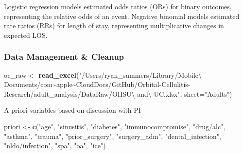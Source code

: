 \documentclass[
]{article}
\newenvironment{Shaded}{\begin{snugshade}}{\end{snugshade}}
\newcommand{\AttributeTok}[1]{\textcolor[rgb]{0.13,0.29,0.53}{#1}}
\newcommand{\FunctionTok}[1]{\textcolor[rgb]{0.13,0.29,0.53}{\textbf{#1}}}
\newcommand{\NormalTok}[1]{#1}
\newcommand{\OtherTok}[1]{\textcolor[rgb]{0.56,0.35,0.01}{#1}}
\newcommand{\StringTok}[1]{\textcolor[rgb]{0.31,0.60,0.02}{#1}}
\begin{document}
Logistic regression models estimated odds ratios (ORs) for binary outcomes,
representing the relative odds of an event. Negative binomial models estimated
rate ratios (RRs) for length of stay, representing multiplicative changes in
expected LOS.

\subsubsection{Data Management \& Cleanup}\label{data-management-cleanup}

\begin{Shaded}
\begin{Highlighting}[]
\NormalTok{oc\_raw }\OtherTok{\textless{}{-}} \FunctionTok{read\_excel}\NormalTok{(}\StringTok{"/Users/ryan\_summers/Library/Mobile\textbackslash{} Documents/com\textasciitilde{}apple\textasciitilde{}CloudDocs/GitHub/Orbital{-}Cellulitis{-}Research/adult\_analysis/DataRaw/OHSU\textbackslash{} and\textbackslash{} UC.xlsx"}\NormalTok{, }\AttributeTok{sheet=}\StringTok{"Adults"}\NormalTok{)}
\end{Highlighting}
\end{Shaded}

A priori variables based on discussion with PI

\begin{Shaded}
\begin{Highlighting}[]
\NormalTok{priori }\OtherTok{\textless{}{-}} \FunctionTok{c}\NormalTok{(}\StringTok{"age"}\NormalTok{, }\StringTok{"sinusitis"}\NormalTok{, }\StringTok{"diabetes"}\NormalTok{, }\StringTok{"immunocompromise"}\NormalTok{, }\StringTok{"drug/alc"}\NormalTok{,}
            \StringTok{"asthma"}\NormalTok{, }\StringTok{"trauma"}\NormalTok{, }\StringTok{"prior\_surgery"}\NormalTok{, }\StringTok{"surgery\_adm"}\NormalTok{,}
            \StringTok{"dental\_infection"}\NormalTok{,  }\StringTok{"nldo/infection"}\NormalTok{, }\StringTok{"spa"}\NormalTok{, }\StringTok{"oa"}\NormalTok{, }\StringTok{"ice"}\NormalTok{)}
\end{Highlighting}
\end{Shaded}
\end{document}
